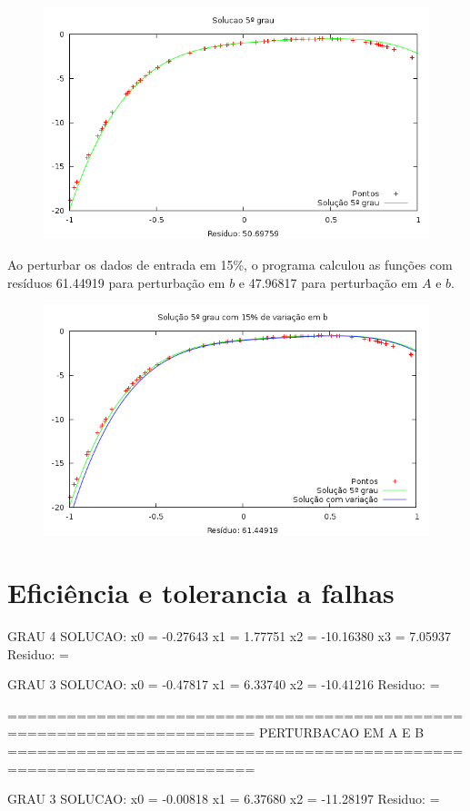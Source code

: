 \begin{figure}[h]
\centering
\includegraphics[scale=0.7]{sol5grau}
\end{figure}
Ao perturbar os dados de entrada em 15\%, o programa calculou as funções 
com resíduos 61.44919  para perturbação em $b$ e 47.96817 para perturbação em $A$ e $b$.
\begin{figure}[h]
\centering
\includegraphics[scale=0.7]{sol5grau_var}
\end{figure}

\chapter{Eficiência e tolerancia a falhas}



GRAU 4
SOLUCAO: 
x0 = -0.27643 
x1 = 1.77751 
x2 = -10.16380 
x3 = 7.05937 
Residuo: = 

GRAU 3
SOLUCAO: 
x0 = -0.47817 
x1 = 6.33740 
x2 = -10.41216 
Residuo: = 



=======================================================================
                      PERTURBACAO EM A E B
=======================================================================




GRAU 3
SOLUCAO: 
x0 = -0.00818 
x1 = 6.37680 
x2 = -11.28197 
Residuo: = 


